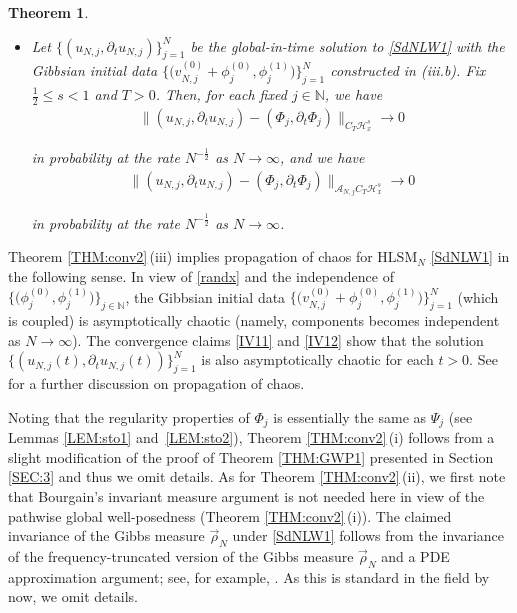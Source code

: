 \documentclass[letterpaper, 11pt,  reqno]{amsart}
\newtheorem{theorem}{Theorem}[section]
\DeclareMathOperator{\Law}{Law}
\newcommand{\1}{\hspace{0.5mm}\text{I}\hspace{0.2mm}}
\newcommand{\noi}{\noindent}
\newcommand{\N}{\mathbb{N}}
\renewcommand{\H}{\mathcal{H}}
\newcommand{\dt}{\partial_t}
\newcommand{\A}{\mathcal{A}}
\newcommand{\rhoo}{\vec \rho_N}
\newcommand{\HLS}{$\text{HLSM}_N$ }
\newcommand{\too}{\longrightarrow}
\numberwithin{equation}{section}
\numberwithin{theorem}{section}
\begin{document}
\begin{theorem}
\begin{itemize}
\noi
such that 
\[
\Law \Big( \big\{\big(v^{(0)}_{N, j} + \phi^{(0)}_j, \phi^{(1)}_j\big)\big\}_{j = 1}^N\Big)
= \rhoo.\]

\smallskip
\item [(iii.c)]
Let 
$\{ (u_{N, j}, \dt  u_{N, j})\}_{j = 1}^N$
be the global-in-time solution to \eqref{SdNLW1} 
with the Gibbsian initial data 
$\big\{\big(v^{(0)}_{N, j} + \phi^{(0)}_j, \phi^{(1)}_j\big)\big\}_{j = 1}^N$
constructed in \textup{(iii.b)}.
Fix 
 $\frac 12 \le s < 1$ and 
$T > 0$.
Then,    for each fixed $j \in \N$, 
we have 
\begin{align}
 \| (u_{N, j}, \dt u_{N, j})   - (\Phi_j, \dt \Phi_j) \|_{ C_T  \H^s_x}
\too 0
\label{IV11}
\end{align}

\noi
in probability at the rate $N^{-\frac 12}$ as $N \to \infty$, and we have 
\begin{align}
  \| (u_{N, j}, \dt u_{N, j})   - (\Phi_j, \dt \Phi_j) \|_{\A_{N, j} C_T  \H^s_x}
\too 0
\label{IV12}
\end{align}

\noi
in probability at the rate $N^{-\frac 12}$  as $N \to \infty$.


\end{itemize}


\end{theorem}




Theorem \ref{THM:conv2}\,(iii)
implies propagation of chaos
for \HLS \eqref{SdNLW1}
in the following sense.
In view of \eqref{randx}
and the independence of $\big\{ \big(\phi^{(0)}_j, \phi^{(1)}_j\big)\big\}_{j \in \N}$, 
the Gibbsian initial data
$\big\{\big(v^{(0)}_{N, j} + \phi^{(0)}_j, \phi^{(1)}_j\big)\big\}_{j = 1}^N$
(which is coupled)
is asymptotically chaotic
(namely, components becomes independent  as $N \to \infty$).
The convergence claims \eqref{IV11} and \eqref{IV12}
show that the solution 
$\{ (u_{N, j}(t), \dt  u_{N, j}(t))\}_{j = 1}^N$
is also 
asymptotically chaotic
for each $t > 0$.
See 
\cite[Definition 2.1 on p.\,177 and Theorem 3.1 on p.\,203]{Sznit}
for a further discussion on propagation of chaos.







Noting that the regularity properties of $\Phi_j$
is essentially the same as $\Psi_j$
(see Lemmas \ref{LEM:sto1} and~\ref{LEM:sto2}), 
Theorem \ref{THM:conv2}\,(i) follows from a slight modification
of the proof of 
Theorem \ref{THM:GWP1} presented in Section \ref{SEC:3}
and thus we omit details.
As for 
Theorem \ref{THM:conv2}\,(ii), 
we first note that Bourgain's invariant measure
argument \cite{BO94, BO96} is not needed here
in view of  the pathwise global well-posedness
(Theorem \ref{THM:conv2}\,(i)).
The claimed invariance
of the Gibbs measure $\rhoo$
under \eqref{SdNLW1}
follows
from 
the invariance of the frequency-truncated version
of the Gibbs measure $\rhoo$
and a PDE approximation argument; 
see, for example, \cite{GKOT, ORTz}.
As this is standard in the field by now,  we omit details.
\end{document}
